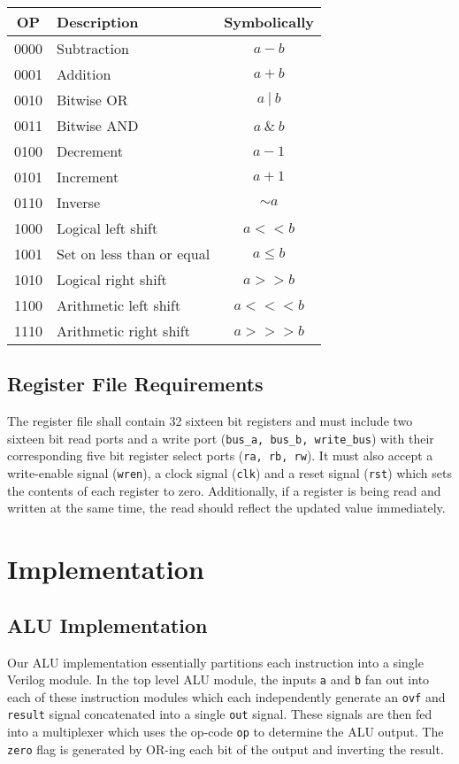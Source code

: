 \documentclass[11pt]{article}
\begin{document}
{\centering
\begin{tabular}{|c|l|c|}
	\hline
	\textbf{OP} & \textbf{Description} & \textbf{Symbolically}\\
	\hline
	0000 & Subtraction & $a - b$ \\
	0001 & Addition & $a + b$ \\
	0010 & Bitwise OR & $a~|~b$ \\
	0011 & Bitwise AND & $a~\&~b$ \\
	0100 & Decrement & $a - 1$ \\
	0101 & Increment & $a + 1$ \\
	0110 & Inverse & $\sim a$ \\
	1000 & Logical left shift & $a << b$ \\
	1001 & Set on less than or equal & $a \leq b$ \\
	1010 & Logical right shift & $a >> b$ \\
	1100 & Arithmetic left shift & $a <<< b$ \\
	1110 & Arithmetic right shift & $a >>> b$ \\
	\hline
\end{tabular} \par
}

\subsection{Register File Requirements}
The register file shall contain 32 sixteen bit registers and must include two sixteen bit read ports and a write port (\texttt{bus\_a, bus\_b, write\_bus}) with their corresponding five bit register select ports (\texttt{ra, rb, rw}). It must also accept a write-enable signal (\texttt{wren}), a clock signal (\texttt{clk}) and a reset signal (\texttt{rst}) which sets the contents of each register to zero. Additionally, if a register is being read and written at the same time, the read should reflect the updated value immediately. 

\section{Implementation}
\subsection{ALU Implementation}
Our ALU implementation essentially partitions each instruction into a single Verilog module. In the top level ALU module, the inputs \texttt{a} and \texttt{b} fan out into each of these instruction modules which each independently generate an \texttt{ovf} and \texttt{result} signal concatenated into a single \texttt{out} signal. These signals are then fed into a multiplexer which uses the op-code \texttt{op} to determine the ALU output. The \texttt{zero} flag is generated by OR-ing each bit of the output and inverting the result.
\end{document}
